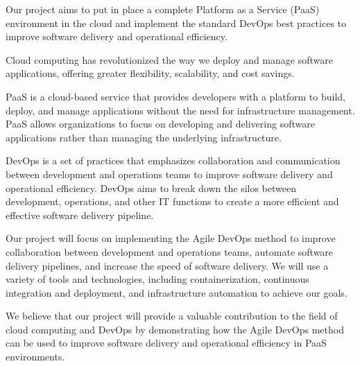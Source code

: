 \pagestyle{fancy}
\fancyhead[L]{\ungaramond\small\textbf{}}
\fancyhead[C]{}
\fancyhead[R]{\ungaramond\small\textbf{}}
\fancyfoot[C]{}
\renewcommand{\headrulewidth}{1.7pt}
\renewcommand{\headrule}{\hbox to\headwidth{\color{gray}\leaders\hrule height \headrulewidth\hfill}}
\renewcommand{\footrulewidth}{1.7pt}
\renewcommand{\footrule}{\hbox to\headwidth{\color{gray}\leaders\hrule height \footrulewidth\hfill}}
\begin{center}

\end{center}
\vspace{0.8cm}
\setcounter{page}{1}


Our project aims to put in place a complete Platform as a Service (PaaS) environment in the cloud and implement the standard DevOps best practices to improve software delivery and operational efficiency. 

Cloud computing has revolutionized the way we deploy and manage software applications, offering greater flexibility, scalability, and cost savings. 

PaaS is a cloud-based service that provides developers with a platform to build, deploy, and manage applications without the need for infrastructure management. PaaS allows organizations to focus on developing and delivering software applications rather than managing the underlying infrastructure. 

DevOps is a set of practices that emphasizes collaboration and communication between development and operations teams to improve software delivery and operational efficiency. DevOps aims to break down the silos between development, operations, and other IT functions to create a more efficient and effective software delivery pipeline. 

Our project will focus on implementing the Agile DevOps method to improve collaboration between development and operations teams, automate software delivery pipelines, and increase the speed of software delivery. We will use a variety of tools and technologies, including containerization, continuous integration and deployment, and infrastructure automation to achieve our goals. 

We believe that our project will provide a valuable contribution to the field of cloud computing and DevOps by demonstrating how the Agile DevOps method can be used to improve software delivery and operational efficiency in PaaS environments.

